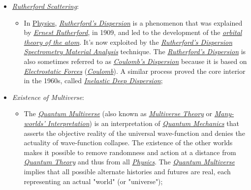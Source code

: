 \documentclass[conference]{IEEEtran}
\begin{document}
\begin{itemize}
  \item \href{https://en.wikipedia.org/wiki/Rutherford_scattering}{\textit{Rutherford Scattering}}:
    \begin{itemize}
        \item In \href{https://en.wikipedia.org/wiki/Physics}{Physics}, \href{https://en.wikipedia.org/wiki/Rutherford_scattering}{\textit{Rutherford's Dispersion}} is a phenomenon that was explained by \href{https://en.wikipedia.org/wiki/Ernest_Rutherford}{\textit{Ernest Rutherford}}, in 1909, and led to the development of the \href{https://en.wikipedia.org/wiki/Atomic_orbital}{\textit{orbital theory of the atom}}. It's now exploited by the \href{https://en.wikipedia.org/wiki/Rutherford_scattering}{\textit{Rutherford's Dispersion Spectrometry Material Analysis}} technique. The \href{https://en.wikipedia.org/wiki/Rutherford_scattering}{\textit{Rutherford's Dispersion}} is also sometimes referred to as \href{https://en.wikipedia.org/wiki/Rutherford_scattering}{\textit{Coulomb's Dispersion}} because it is based on \href{https://en.wikipedia.org/wiki/Electrostatics}{\textit{Electrostatic Forces}} (\href{https://en.wikipedia.org/wiki/Coulomb\%27s_law}{\textit{Coulomb}}). A similar process proved the core interior in the 1960s, called \href{https://arxiv.org/abs/1601.05453}{\textit{Inelastic Deep Dispersion}};
    \end{itemize}
  \item \textit{Existence of Multiverse}:
    \begin{itemize}
        \item The \href{https://en.wikipedia.org/wiki/Many-worlds_interpretation}{\textit{Quantum Multiverse}} (also known as \href{https://en.wikipedia.org/wiki/Many-worlds_interpretation}{\textit{Multiverse Theory}} or \href{https://en.wikipedia.org/wiki/Many-worlds_interpretation}{\textit{Many-worlds' Interpretation}}) is an interpretation of \href{https://en.wikipedia.org/wiki/Quantum_mechanics}{\textit{Quantum Mechanics}} that asserts the objective reality of the universal wave-function and denies the actuality of wave-function collapse. The existence of the other worlds makes it possible to remove randomness and action at a distance from \href{https://en.wikipedia.org/wiki/Quantum_theory}{\textit{Quantum Theory}} and thus from all \href{https://en.wikipedia.org/wiki/Physics}{\textit{Physics}}. The \href{https://en.wikipedia.org/wiki/Many-worlds_interpretation}{\textit{Quantum Multiverse}} implies that all possible alternate histories and futures are real, each representing an actual "world" (or "universe");
    \end{itemize}
\end{itemize}
\end{document}
